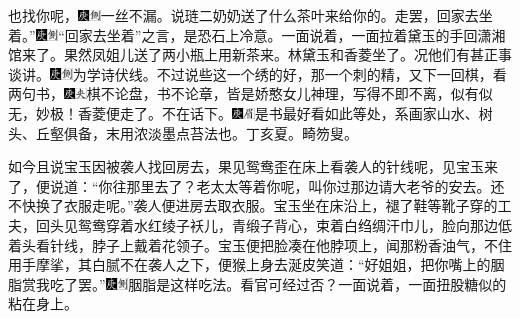 也找你呢，{\includegraphics[width=3mm]{../Images/00004}\includegraphics[width=3mm]{../Images/00011}\footnotesize \kaishu 一丝不漏。}说琏二奶奶送了什么茶叶来给你的。走罢，回家去坐着。''{\includegraphics[width=3mm]{../Images/00004}\includegraphics[width=3mm]{../Images/00011}\footnotesize \kaishu ``回家去坐着''之言，是恐石上冷意。}一面说着，一面拉着黛玉的手回潇湘馆来了。果然凤姐儿送了两小瓶上用新茶来。林黛玉和香菱坐了。况他们有甚正事谈讲。{\includegraphics[width=3mm]{../Images/00004}\includegraphics[width=3mm]{../Images/00011}\footnotesize \kaishu 为学诗伏线。}不过说些这一个绣的好，那一个刺的精，又下一回棋，看两句书，{\includegraphics[width=3mm]{../Images/00004}\includegraphics[width=3mm]{../Images/00012}\footnotesize \kaishu 棋不论盘，书不论章，皆是娇憨女儿神理，写得不即不离，似有似无，妙极！}香菱便走了。不在话下。{\includegraphics[width=3mm]{../Images/00004}\includegraphics[width=3mm]{../Images/00010}\footnotesize \kaishu 是书最好看如此等处，系画家山水、树头、丘壑俱备，末用浓淡墨点苔法也。丁亥夏。畸笏叟。}

如今且说宝玉因被袭人找回房去，果见鸳鸯歪在床上看袭人的针线呢，见宝玉来了，便说道：``你往那里去了？老太太等着你呢，叫你过那边请大老爷的安去。还不快换了衣服走呢。''袭人便进房去取衣服。宝玉坐在床沿上，褪了鞋等靴子穿的工夫，回头见鸳鸯穿着水红绫子袄儿，青缎子背心，束着白绉绸汗巾儿，脸向那边低着头看针线，脖子上戴着花领子。宝玉便把脸凑在他脖项上，闻那粉香油气，不住用手摩挲，其白腻不在袭人之下，便猴上身去涎皮笑道：``好姐姐，把你嘴上的胭脂赏我吃了罢。''{\includegraphics[width=3mm]{../Images/00004}\includegraphics[width=3mm]{../Images/00011}\footnotesize \kaishu 胭脂是这样吃法。看官可经过否？}一面说着，一面扭股糖似的粘在身上。

